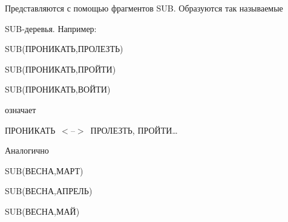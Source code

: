     


    Представляются с помощью фрагментов SUB. Образуются так называемые 


SUB-деревья. Например: 


    


     \smallskip


     


      {\small


 


     \noindent


        SUB(ПРОНИКАТЬ,ПРОЛЕЗТЬ) 


    


    \noindent


        SUB(ПРОНИКАТЬ,ПРОЙТИ) 


    


    \noindent


        SUB(ПРОНИКАТЬ,ВОЙТИ) 


        }


        


             \smallskip





\noindent


означает 





     \smallskip


{\small





    \noindent


    ПРОНИКАТЬ~$<$--$>$~ПРОЛЕЗТЬ, ПРОЙТИ\ldots


    }


    


         \smallskip





Аналогично





     \smallskip





{\small





\noindent


    SUB(ВЕСНА,МАРТ) 


    


    \noindent


        SUB(ВЕСНА,АПРЕЛЬ) 


    


        \noindent


        SUB(ВЕСНА,МАЙ) 


        }


